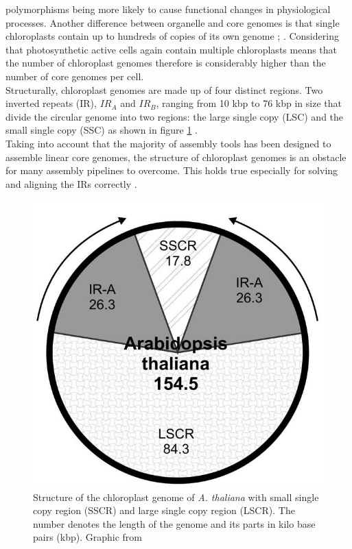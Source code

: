 polymorphisms being more likely to cause functional changes in physiological
processes. Another difference between organelle and core genomes is that single
chloroplasts contain up to hundreds of copies of its own genome \cite{kumar_2014};
\cite{bendich_1987}. Considering that photosynthetic active cells again contain multiple
chloroplasts means that the number of chloroplast genomes therefore is considerably higher than the number of core genomes per cell. \\
Structurally, chloroplast genomes are made up of four distinct regions. Two inverted
repeats (IR), $IR_A$ and $IR_B$, ranging from 10 kbp to 76 kbp in size that divide the
circular genome into two regions: the large
single copy (LSC) and the small single copy (SSC) as shown in figure \ref{fig:cpast_genome} \cite{palmer_1985}.\\
Taking into account that the majority of assembly tools has been designed to assemble
linear core genomes, the structure of chloroplast genomes is an obstacle for many assembly
pipelines to overcome. This holds true especially for solving and aligning the IRs
correctly \cite{Wang2018}.

\begin{figure}[H]
\centering
\includegraphics[height=.55\textheight, width=.95\textwidth]{Figures/cpast}
\decoRule
\caption[Structure of a chloroplast genome]{Structure of the chloroplast genome of
  \textit{A. thaliana} with small single copy region (SSCR) and large single copy region
  (LSCR). The number denotes the length of the genome and its parts in kilo base pairs
  (kbp). Graphic from \cite{olejniczak2016chloroplasts}}
\label{fig:cpast_genome}
\end{figure}

